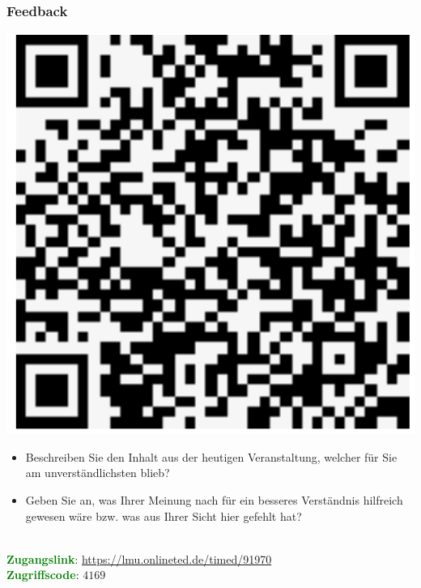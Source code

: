 \documentclass[10pt]{beamer}
\newcommand{\htgreen}[1] {{\bf \textcolor{Green}{#1}}}
\begin{document}
\begin{frame}
  \frametitle{Feedback}
  \noindent\begin{minipage}{0.4\textwidth}
  \includegraphics[width=\linewidth]{images/feedback.png}
  \end{minipage}
  \hfill
  \begin{minipage}{0.5\textwidth}\raggedleft
    \begin{itemize}
      \item Beschreiben Sie den Inhalt aus der heutigen Veranstaltung,
        welcher für Sie am unverständlichsten blieb? 
      \item Geben Sie an, was Ihrer Meinung nach für ein besseres
        Verständnis hilfreich gewesen wäre bzw. was aus Ihrer Sicht hier gefehlt hat? 
    \end{itemize}
  \end{minipage}
  \vspace{0.5cm}
  \\
  \htgreen{Zugangslink}: \url{https://lmu.onlineted.de/timed/91970}\\
  \htgreen{Zugriffscode}: $4169$
\end{frame}





\end{document}
